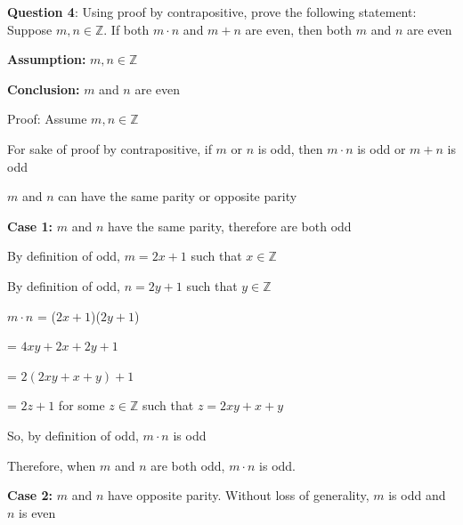 \documentclass{article} %
\newcommand{\question}[2][]{\begin{flushleft}
        \textbf{Question #1}: #2
\end{flushleft}}
\begin{document}
    \newpage


    \question[4]{Using proof by contrapositive, prove the following statement: Suppose $m, n \in \mathbb{Z}.$ If both $m \cdot n$ and $m+n$ are even, then 
    both $m$ and $n$ are even}



    \textbf{Assumption:} $m, n \in \mathbb{Z}$
    
    \textbf{Conclusion:} $m$ and $n$ are even

    Proof: Assume $m, n \in \mathbb{Z}$

    For sake of proof by contrapositive, if $m$ or $n$ is odd, then $m \cdot n$ is odd or $m+n$ is odd

    $m$ and $n$ can have the same parity or opposite parity

    \vspace*{0.1cm}

    \textbf{Case 1:} $m$ and $n$ have the same parity, therefore are both odd

    By definition of odd, $m = 2x + 1$ such that $x \in \mathbb{Z}$ 
    
    By definition of odd, $n = 2y + 1$ such that $y \in \mathbb{Z}$

    $m \cdot n$ = ($2x + 1$)($2y + 1$)

    \tabto*{1.42cm} = $4xy + 2x + 2y + 1$

    \tabto*{1.42cm} = $2(2xy + x + y) + 1$

    \tabto*{1.42cm} = $2z + 1$ for some $z \in \mathbb{Z}$ such that $z = 2xy + x + y$

    So, by definition of odd, $m \cdot n$ is odd

    Therefore, when $m$ and $n$ are both odd, $m \cdot n$ is odd.

    \vspace*{0.1cm}

    \textbf{Case 2:} $m$ and $n$ have opposite parity. Without loss of generality, $m$ is odd and $n$ is even
\end{document}
